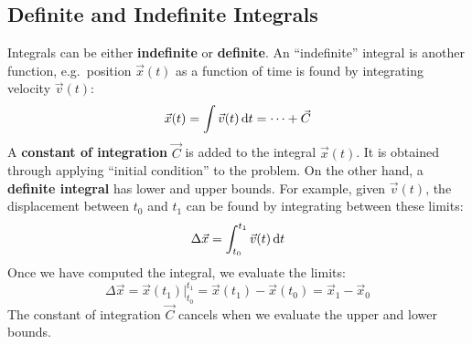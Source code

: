 \documentclass{../../oss-handout}
\begin{document}
\subsection{Definite and Indefinite Integrals}
Integrals can be either \textbf{indefinite} or \textbf{definite}. An
``indefinite'' integral is another function, e.g.\ position $\vec x(t)$ as a
function of time is found by integrating velocity $\vec v(t)$:
\begin{equation*}
  \vec x(t)=\int\vec v(t)\dl t=\cdots+\vec C
\end{equation*}
A \textbf{constant of integration} $\vec C$ is added to the integral
$\vec x(t)$. It is obtained through applying ``initial condition'' to the
problem. On the other hand, a \textbf{definite integral} has lower and upper
bounds. For example, given $\vec v(t)$, the displacement between $t_0$ and
$t_1$ can be found by integrating between these limits:
\begin{equation*}
  \Delta\vec x=\int_{t_0}^{t_1} \vec v(t)\dl t
\end{equation*}
Once we have computed the integral, we evaluate the limits:
\begin{equation*}
  \Delta\vec x =
  \vec x(t_1)\Big|^{t_1}_{t_0}=
  \vec x(t_1)-\vec x(t_0)=
  \vec x_1-\vec x_0
\end{equation*}
The constant of integration $\vec C$ cancels when we evaluate the upper and
lower bounds.
\end{document}
